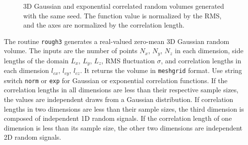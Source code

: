  \begin{figure}[H] 
   \caption{3D Gaussian and exponential correlated random volumes generated with the same seed. The function value is normalized by the RMS, and the axes are normalized by the correlation length.}
\end{figure}



The routine \texttt{rough3} generates a real-valued zero-mean 3D Gaussian random volume. The inputs are the number of points $N_x$, $N_y$, $N_z$ in each dimension, side lengths of the domain $L_x$, $L_y$, $L_z$, RMS fluctuation $\sigma$, and correlation lengths in each dimension $l_{cx}$, $l_{cy}$, $l_{cz}$.  It returns the volume in \texttt{meshgrid} format. Use string switch \texttt{norm} or \texttt{exp} for Gaussian or exponential correlation functions. If the correlation lengths in all dimensions are less than their respective sample sizes, the values are independent draws from a Gaussian distribution. If correlation lengths in two dimensions are less than their sample sizes, the third dimension is composed of independent 1D random signals. If the correlation length of one dimension is less than its sample size, the other two dimensions are independent 2D random signals. 

